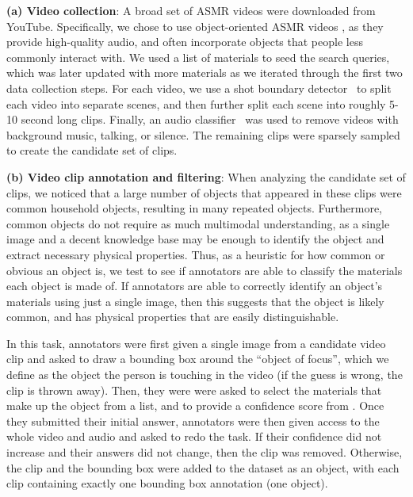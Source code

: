 \documentclass[runningheads]{llncs}
\begin{document}
\noindent \textbf{(a) Video collection}: A broad set of ASMR videos were downloaded from YouTube. Specifically, we chose to use object-oriented ASMR videos
, as they provide high-quality audio, and often incorporate objects that people less commonly interact with.
We used a list of materials \cite{materiallist} to seed the search queries, which was later updated with more materials as we iterated through the first two data collection steps.
For each video, we use a shot boundary detector~\cite{souvcek2020transnet} to split each video into separate scenes, and then further split each scene into roughly 5-10 second long clips. Finally, an audio classifier~\cite{giannakopoulos2015pyaudioanalysis} was used to remove videos with background music, talking, or silence. The remaining clips were sparsely sampled to create the candidate set of clips.

\noindent \textbf{(b) Video clip annotation and filtering}: When analyzing the candidate set of clips, we noticed that a large number of objects that appeared in these clips were common household objects, resulting in many repeated objects. Furthermore, common objects do not require as much multimodal understanding, as a single image and a decent knowledge base may be enough to identify the object and extract necessary physical properties. Thus, as a heuristic for how common or obvious an object is, we test to see if annotators are able to classify the materials each object is made of. If annotators are able to correctly identify an object's materials using just a single image, then this suggests that the object is likely common, and has physical properties that are easily distinguishable. 

In this task, annotators were first given a single image from a candidate video clip and asked to draw a bounding box around the ``object of focus'', which we define as the object the person is touching in the video (if the guess is wrong, the clip is thrown away). Then, they were were asked to select the materials that make up the object from a list, and to provide a confidence score from . Once they submitted their initial answer, annotators were then given access to the whole video and audio and asked to redo the task. If their confidence did not increase and their answers did not change, then the clip was removed. Otherwise, the clip and the bounding box were added to the dataset as an object, with each clip containing exactly one bounding box annotation (one object). 
\end{document}
